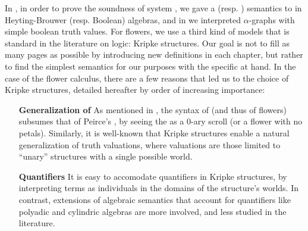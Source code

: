 In , in order to prove the soundness of system
, we gave a  (resp. ) semantics to  in
Heyting-Brouwer (resp. Boolean) algebras, and in  we
interpreted $\alpha$-graphs with simple boolean truth values. For flowers, we
use a third kind of models that is standard in the literature on 
logic: Kripke structures. Our goal is not to fill as many pages as possible by
introducing new definitions in each chapter, but rather to find the simplest
semantics for our purposes with the specific  at hand. In the case
of the flower calculus, there are a few reasons that led us to the choice of
Kripke structures, detailed hereafter by order of increasing importance:
\begin{itemize}
  \item[\textbf{Generalization of \kl{EGs}}]
    As mentioned in , the syntax of   (and thus of
    flowers) subsumes that of Peirce's  , by seeing the  as a
    $0$-ary scroll (or a flower with no petals). Similarly, it is well-known
    that Kripke structures enable a natural generalization of truth valuations,
    where  valuations are those limited to ``unary'' structures with a
    single possible world.
  
  \item[\textbf{Quantifiers}]
    It is easy to accomodate quantifiers in Kripke structures, by interpreting
    terms as individuals in the domains of the structure's worlds. In contrast,
    extensions of algebraic semantics that account for quantifiers like polyadic
    and cylindric algebras are more involved, and less studied in the
    literature.
  

\end{itemize}
